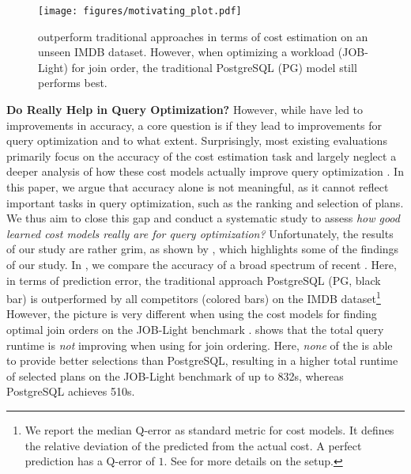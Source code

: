 \begin{figure}
    \centering
    \texttt{[image: figures/motivating\_plot.pdf]}
    \caption{ \lcms outperform traditional approaches in terms of cost estimation on an unseen IMDB dataset. 
     However, when optimizing a workload (JOB-Light) for join order, the traditional PostgreSQL (PG) model still performs best.}
    \label{fig:motivating_plot}
\end{figure}

\noindent\textbf{Do \lcms Really Help in Query Optimization?}
However, while \lcms have led to improvements in accuracy, a core question is if they lead to improvements for query optimization and to what extent. 
Surprisingly, most existing evaluations primarily focus on the accuracy of the cost estimation task and largely neglect a deeper analysis of how these cost models actually improve query optimization \cite{hilprecht2022, ganapathi2009, akdere2012, kipf2019, marcus2019, zibo_liang_dace_2024, sun2019, yang2023, zhao2022, lu2022, zhou2020}.
In this paper‚ we argue that accuracy alone is not meaningful, as it cannot reflect important tasks in query optimization, such as the ranking and selection of plans.
We thus aim to close this gap and conduct a systematic study to assess \textit{how good learned cost models really are for query optimization?}
Unfortunately, the results of our study are rather grim, as shown by , which highlights some of the findings of our study.
In  , we compare the accuracy of a broad spectrum of recent \lcms. Here, in terms of prediction error, the traditional approach PostgreSQL (PG, black bar) is outperformed by all \lcm competitors (colored bars) on the IMDB dataset\footnote{We report the median Q-error as standard metric for cost models. It defines the relative deviation of the predicted from the actual cost. A perfect prediction has a Q-error of $1$. See  for more details on the setup.}
However, the picture is very different when using the cost models for finding optimal join orders on the JOB-Light benchmark \cite{kipf2019}. 
  shows that the total query runtime is \textit{not} improving when using \lcms for join ordering.
Here, \textit{none} of the \lcms is able to provide better selections than PostgreSQL, resulting in a higher total runtime of selected plans on the JOB-Light benchmark of up to 832s, whereas PostgreSQL achieves 510s. 

